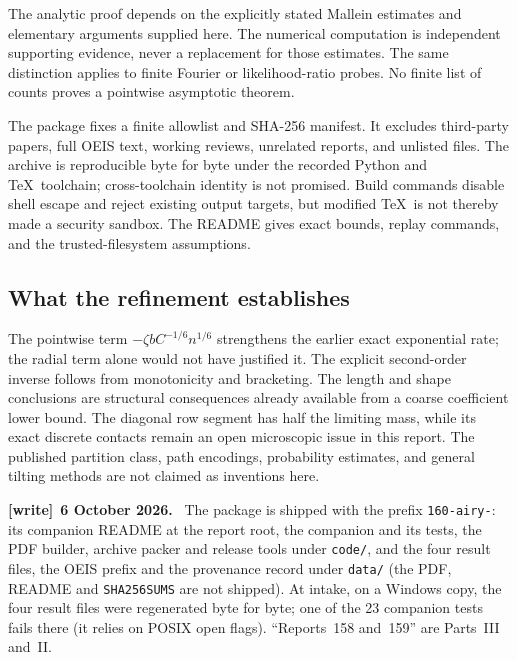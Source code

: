 \documentclass[11pt,letterpaper]{article}
\numberwithin{equation}{section}
\theoremstyle{remark}\newtheorem{remark}[theorem]{Remark}
\newcommand{\file}[1]{\nolinkurl{#1}}
\newenvironment{writenote}[1][]{\par\smallskip\begingroup\small
 \noindent\textbf{[write]}\if\relax\detokenize{#1}\relax\else~\textbf{#1.}\fi\ }%
 {\par\endgroup\smallskip}
\begin{document}
The analytic proof depends on the explicitly stated Mallein estimates
and elementary arguments supplied here. The numerical computation
is independent supporting evidence, never a replacement for those
estimates. The same distinction applies to finite Fourier or
likelihood-ratio probes. No finite list of counts proves a
pointwise asymptotic theorem.

The package fixes a finite allowlist and SHA-256 manifest. It excludes
third-party papers, full OEIS text, working reviews, unrelated reports,
and unlisted files. The archive is reproducible byte for byte under
the recorded Python and \TeX\ toolchain; cross-toolchain identity is
not promised. Build commands disable shell escape and reject existing
output targets, but modified \TeX\ is not thereby made a security
sandbox. The README gives exact bounds, replay commands, and the
trusted-filesystem assumptions.

\subsection{What the refinement establishes}
The pointwise term $-\zeta b C^{-1/6}n^{1/6}$ strengthens the earlier
exact exponential rate; the radial term alone would not have justified
it. The explicit second-order inverse follows from monotonicity and
bracketing. The length and shape conclusions are structural
consequences already available from a coarse coefficient lower bound.
The diagonal row segment has half the limiting mass, while its exact
discrete contacts remain an open microscopic issue in this report.
The published partition class, path encodings, probability estimates,
and general tilting methods are not claimed as inventions here.
\begin{writenote}[6 October 2026]
The package is shipped with the prefix \file{160-airy-}: its companion README at the report root, the companion and its tests, the PDF builder, archive packer and release tools under \file{code/}, and the four result files, the OEIS prefix and the provenance record under \file{data/} (the PDF, README and \file{SHA256SUMS} are not shipped). At intake, on a Windows copy, the four result files were regenerated byte for byte; one of the 23 companion tests fails there (it relies on POSIX open flags). ``Reports~158 and~159'' are Parts~III and~II.
\end{writenote}

\clearpage
\end{document}
